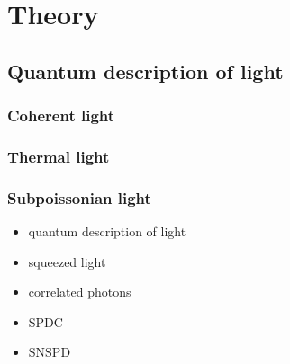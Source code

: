 \section{Theory}
\subsection{Quantum description of light}
\subsubsection{Coherent light}
\subsubsection{Thermal light}
\subsubsection{Subpoissonian light}
\begin{itemize}
    \item quantum description of light
    \item squeezed light
    \item correlated photons
    \item SPDC
    \item SNSPD
\end{itemize}

